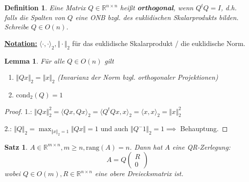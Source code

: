 \documentclass{book}
\newtheorem{theorem}[algorithm]{Satz}
\newtheorem{lemma}[algorithm]{Lemma}
\newtheorem{definition}[algorithm]{Definition}
\def\R{\mathbb{R}}
\def\rang{\text{rang}}
\def\cond{\text{cond}}
\begin{document}
        \begin{definition}\label{d2.8}
            Eine Matrix $Q\in\R^{n\times n}$ heißt \textbf{orthogonal}, wenn $Q^tQ=I$, d.h. falls die Spalten von $Q$ eine ONB bzgl. des 
            euklidischen Skalarprodukts bilden. Schreibe $Q\in O(n)$.
        \end{definition}

        \underline{\textbf{Notation:}} $\langle \cdot,\cdot \rangle_2,\Vert \cdot \Vert_2$ für das euklidische Skalarprodukt / die euklidische Norm.

        \begin{lemma}\label{l2.9}
            Für alle $Q\in O(n)$ gilt
            \begin{enumerate}
                \item $\Vert Qx \Vert_2=\Vert x \Vert_2$ (Invarianz der Norm bzgl. orthogonaler Projektionen)
                \item $\cond_2(Q)=1$
            \end{enumerate}
        \end{lemma}

        \begin{proof}
            1.: $\Vert Qx \Vert_2^2=\langle Qx,Qx \rangle_2=\langle Q^tQx,x \rangle_2=\langle x,x \rangle_2=\Vert x \Vert_2^2$

            2.: $\Vert Q \Vert_2=\max_{\Vert x \Vert_2=1}\Vert Qx \Vert=1$ und auch $\Vert Q^-1 \Vert_2=1\implies$ Behauptung.
        \end{proof}

        \begin{theorem}\label{s2.10}
            $A\in\R^{m\times n},m\geq n,\rang(A)=n$. Dann hat $A$ eine QR-Zerlegung:
            \begin{equation*}
                A=Q\begin{pmatrix*}
                    R\\
                    0
                \end{pmatrix*}
            \end{equation*}
            wobei $Q\in O(m),R\in\R^{n\times n}$ eine obere Dreiecksmatrix ist.
        \end{theorem}
\end{document}
